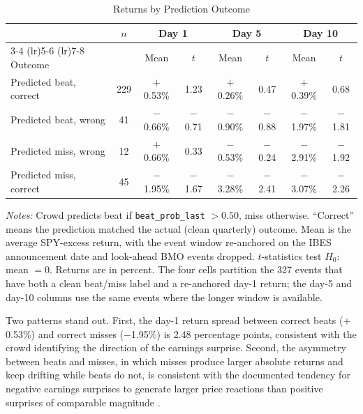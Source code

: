 \documentclass[11pt]{article}
\begin{document}
\begin{table}[htbp]
\centering
\begin{threeparttable}
\caption{Returns by Prediction Outcome}
\label{tab:four_cell}
\begin{tabular}{lccccccc}
\toprule
& $n$ & \multicolumn{2}{c}{Day 1} & \multicolumn{2}{c}{Day 5} & \multicolumn{2}{c}{Day 10} \\
\cmidrule(lr){3-4} \cmidrule(lr){5-6} \cmidrule(lr){7-8}
Outcome & & Mean & $t$ & Mean & $t$ & Mean & $t$ \\
\midrule
Predicted beat, correct & 229 & $+$0.53\% & 1.23 & $+$0.26\% & 0.47 & $+$0.39\% & 0.68 \\
Predicted beat, wrong & 41 & $-$0.66\% & $-$0.71 & $-$0.90\% & $-$0.88 & $-$1.97\% & $-$1.81 \\
Predicted miss, wrong & 12 & $+$0.66\% & 0.33 & $-$0.53\% & $-$0.24 & $-$2.91\% & $-$1.92 \\
Predicted miss, correct & 45 & $-$1.95\% & $-$1.67 & $-$3.28\% & $-$2.41 & $-$3.07\% & $-$2.26 \\
\bottomrule
\end{tabular}
\begin{tablenotes}
\small
\item \textit{Notes:} Crowd predicts beat if \texttt{beat\_prob\_last} $> 0.50$, miss otherwise. ``Correct'' means the prediction matched the actual (clean quarterly) outcome. Mean is the average SPY-excess return, with the event window re-anchored on the IBES announcement date and look-ahead BMO events dropped. $t$-statistics test $H_0$: mean $= 0$. Returns are in percent. The four cells partition the 327 events that have both a clean beat/miss label and a re-anchored day-1 return; the day-5 and day-10 columns use the same events where the longer window is available.
\end{tablenotes}
\end{threeparttable}
\end{table}

Two patterns stand out. First, the day-1 return spread between correct beats ($+$0.53\%) and correct misses ($-$1.95\%) is 2.48 percentage points, consistent with the crowd identifying the direction of the earnings surprise. Second, the asymmetry between beats and misses, in which misses produce larger absolute returns and keep drifting while beats do not, is consistent with the documented tendency for negative earnings surprises to generate larger price reactions than positive surprises of comparable magnitude \citep{skinner1994earnings}.
\end{document}
